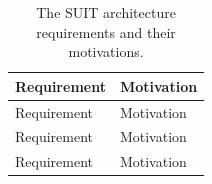 \documentclass[0-thesis.tex]{subfiles}
\begin{document}
\begin{small}
\begin{longtable}[]{@{}ll@{}}
    \caption{The SUIT architecture requirements and their motivations.}
    \label{tab:architecture-evaluation}\\
    \toprule
    \begin{minipage}[b]{0.41\columnwidth}\raggedright\strut
    Requirement\strut
    \end{minipage} & \begin{minipage}[b]{0.53\columnwidth}\raggedright\strut
    Motivation\strut
    \end{minipage}\tabularnewline
    \midrule
    \endfirsthead
    \toprule
    \begin{minipage}[b]{0.41\columnwidth}\raggedright\strut
    Requirement\strut
    \end{minipage} & \begin{minipage}[b]{0.53\columnwidth}\raggedright\strut
    Motivation\strut
    \end{minipage}\tabularnewline
    \midrule
    \endhead
    \toprule
    \begin{minipage}[b]{0.41\columnwidth}\raggedright\strut
    Requirement\strut
    \end{minipage} & \begin{minipage}[b]{0.53\columnwidth}\raggedright\strut
    Motivation\strut
    \end{minipage}\tabularnewline
    \midrule
    \endhead
    \toprule
    \begin{minipage}[b]{0.41\columnwidth}\raggedright\strut
    Requirement\strut
    \end{minipage} & \begin{minipage}[b]{0.53\columnwidth}\raggedright\strut
    Motivation\strut
    \end{minipage}\tabularnewline
    \midrule
    \endhead


\end{longtable}
\end{small}
\end{document}
